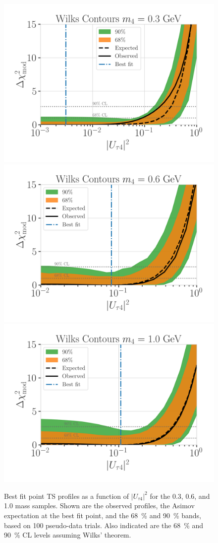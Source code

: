 \begin{figure}[h]
    \includegraphics[width=0.52\linewidth]{figures/results/best_fit/brazil_band_with_asimov_0.3_GeV_updated_with_bfp_with_1sigma.png}
    \includegraphics[width=0.52\linewidth]{figures/results/best_fit/brazil_band_with_asimov_0.6_GeV_updated_with_bfp_with_1sigma.png}
    \includegraphics[width=0.52\linewidth]{figures/results/best_fit/brazil_band_with_asimov_1.0_GeV_updated_with_bfp_with_1sigma.png}
	\caption[Best fit point TS profiles]{Best fit point TS profiles as a function of $|U_{\tau4}|^2$ for the \SI{0.3}{\gev}, \SI{0.6}{\gev}, and \SI{1.0}{\gev} mass samples. Shown are the observed profiles, the Asimov expectation at the best fit point, and the \SI{68}{\percent} and \SI{90}{\percent} bands, based on 100 pseudo-data trials. Also indicated are the \SI{68}{\percent} and \SI{90}{\percent} CL levels assuming Wilks' theorem.}
\end{figure}


